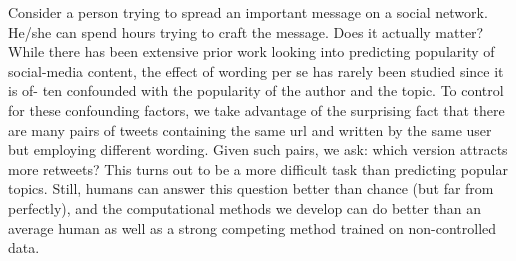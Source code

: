Consider a person trying to spread an important message on a social network. He/she can spend hours trying to craft the message. Does it actually matter? While there has been extensive prior work looking into predicting popularity of social-media content, the effect of wording per se has rarely been studied since it is of- ten confounded with the popularity of the author and the topic. To control for these confounding factors, we take advantage of the surprising fact that there are many pairs of tweets containing the same url and written by the same user but employing different wording. Given such pairs, we ask: which version attracts more retweets? This turns out to be a more difficult task than predicting popular topics. Still, humans can answer this question better than chance (but far from perfectly), and the computational methods we develop can do better than an average human as well as a strong competing method trained on non-controlled data.

